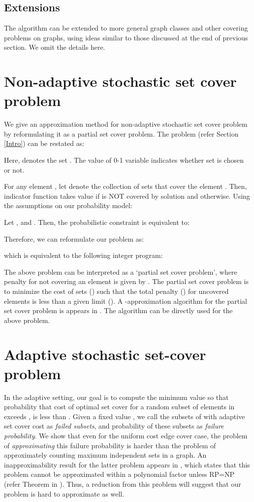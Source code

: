 \documentclass[11pt,onecolumn]{article}
\begin{document}
\subsection{Extensions}
The algorithm can be extended to more general graph classes and other covering problems on graphs, using ideas similar to those discussed at the end of previous section. We omit the details here.
\section{Non-adaptive stochastic set cover problem}
We give an approximation method for non-adaptive stochastic set cover problem by reformulating it as a partial set cover problem. The problem (refer Section \ref{Intro}) can be restated as:

 Here,  denotes the set . The value of 0-1 variable  indicates whether set  is chosen or not. 

For any element , let  denote the collection of sets that cover the element . Then, indicator function  takes value  if  is NOT covered by solution  and  otherwise. 
Using the assumptions on our probability model:


Let , and . Then, the probabilistic constraint is equivalent to:

Therefore, we can reformulate our problem as:

which is equivalent to the following integer program:


The above problem can be interpreted as a `partial set cover problem', where penalty for not covering an element  is given by . The partial set cover problem is to minimize the cost of sets () such that the total penalty () for uncovered elements is less than a given limit (). A -approximation algorithm for the partial set cover problem is appears in \cite{partialCover}. The algorithm can be directly used for the above problem. 

\section{Adaptive stochastic set-cover problem}
In the adaptive setting, our goal is to compute the minimum value  so that probability that cost of optimal set cover for a random subset of elements in  exceeds , is less than . Given a fixed value , we call the subsets of  with adaptive set cover cost  as {\it failed subsets}, and probability of these subsets as {\it failure probability}. We show that even for the uniform cost edge cover case, the problem of {\it approximating} this failure probability is harder than the problem of approximately counting maximum independent sets in a graph. 
An inapproximability result for the latter problem appears in \cite{luby-counting}, which states that this problem cannot be approximated within a polynomial factor unless RP=NP (refer Theorem  in \cite{luby-counting}). 
Thus, a reduction from this problem will suggest that our problem is hard to approximate as well.
\end{document}
